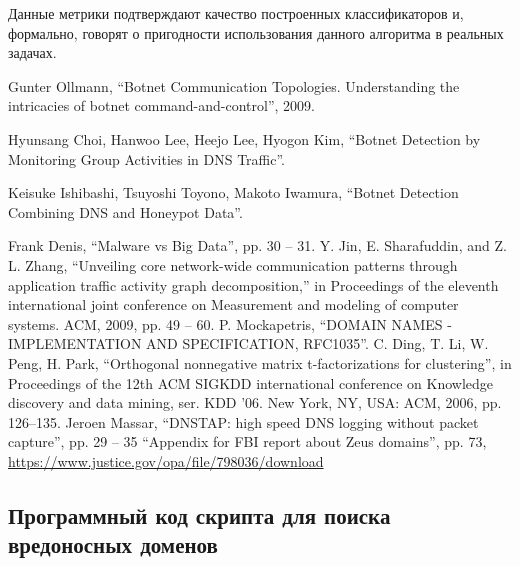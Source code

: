 \documentclass[14pt]{extreport} %
\begin{document}
Данные метрики подтверждают качество построенных классификаторов и, формально, говорят о пригодности использования данного алгоритма в реальных задачах.



\begin{thebibliography}{99}
		
	 Gunter Ollmann, ``Botnet Communication Topologies. Understanding the intricacies of botnet command-and-control'', 2009.
		
	 Hyunsang Choi, Hanwoo Lee, Heejo Lee, Hyogon Kim, ``Botnet Detection by Monitoring Group Activities in
	DNS Traffic''.
		
	 Keisuke Ishibashi, Tsuyoshi Toyono, Makoto Iwamura, ``Botnet Detection Combining DNS and Honeypot Data''.
		
	 Frank Denis, ``Malware vs Big Data'', pp. 30 -- 31.
	 Y. Jin, E. Sharafuddin, and Z. L. Zhang, “Unveiling core network-wide communication patterns through application traffic activity graph decomposition,” in Proceedings of the eleventh international joint conference on Measurement and modeling of computer systems. ACM, 2009, pp. 49 -- 60.
	  P. Mockapetris, ``DOMAIN NAMES - IMPLEMENTATION AND SPECIFICATION, RFC1035''.
	 C. Ding, T. Li, W. Peng, H. Park, ``Orthogonal nonnegative matrix t-factorizations for clustering'', in Proceedings of the 12th ACM SIGKDD
	international conference on Knowledge discovery and data mining, ser.
	KDD ’06. New York, NY, USA: ACM, 2006, pp. 126–135.
	 Jeroen Massar, ``DNSTAP: high speed DNS logging without packet capture'', pp. 29 -- 35
	 ``Appendix for FBI report about Zeus domains'', pp. 73, \url{https://www.justice.gov/opa/file/798036/download}
\end{thebibliography}

\begin{appendices}
	
	\renewcommand\chaptername{Appendix}
	
	\chapter{Программный код скрипта для поиска вредоносных доменов}
	\label{appendix:code}
	
\end{appendices}
\end{document}
